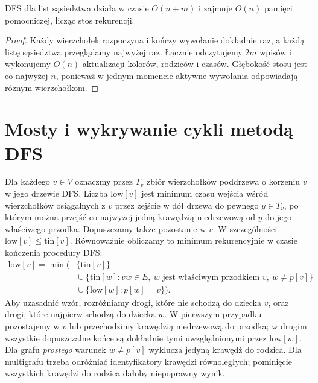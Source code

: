 \begin{stwierdzenie}
\label{prop:tg-dfs-complexity}
DFS dla list sąsiedztwa działa w czasie $O(n+m)$
i zajmuje $O(n)$ pamięci pomocniczej,
licząc stos rekurencji.
\end{stwierdzenie}
\begin{proof}
Każdy wierzchołek rozpoczyna i kończy wywołanie
dokładnie raz, a każdą listę sąsiedztwa
przeglądamy najwyżej raz. Łącznie odczytujemy
$2m$ wpisów i wykonujemy $O(n)$ aktualizacji
kolorów, rodziców i czasów. Głębokość stosu
jest co najwyżej $n$, ponieważ w jednym
momencie aktywne wywołania odpowiadają
różnym wierzchołkom.
\end{proof}

\section{Mosty i wykrywanie cykli metodą DFS}
\label{sec:tg-algo-low}

Dla każdego $v\in V$ oznaczmy przez $T_v$ zbiór
wierzchołków poddrzewa o korzeniu $v$ w jego drzewie DFS.
Liczba $\mathrm{low}[v]$ jest minimum czasu wejścia
wśród wierzchołków osiągalnych z $v$ przez zejście
w dół drzewa do pewnego $y\in T_v$, po którym można
przejść co najwyżej jedną krawędzią niedrzewową
od $y$ do jego właściwego przodka. Dopuszczamy także
pozostanie w $v$.
W szczególności $\mathrm{low}[v]\leq\mathrm{tin}[v]$.
Równoważnie obliczamy to minimum rekurencyjnie
w czasie kończenia procedury DFS:
\[
\begin{aligned}
\mathrm{low}[v]=\min\bigl(
  &\{\mathrm{tin}[v]\}\\
  &{}\cup\{\mathrm{tin}[w]:vw\in E,\
                  w\text{ jest właściwym przodkiem }v,\ w\ne p[v]\}\\
  &{}\cup\{\mathrm{low}[w]:p[w]=v\}
\bigr).
\end{aligned}
\]
Aby uzasadnić wzór, rozróżniamy drogi, które nie
schodzą do dziecka $v$, oraz drogi, które najpierw
schodzą do dziecka $w$. W pierwszym przypadku
pozostajemy w $v$ lub przechodzimy krawędzią niedrzewową
do przodka; w drugim wszystkie dopuszczalne końce
są dokładnie tymi uwzględnionymi przez $\mathrm{low}[w]$.
Dla grafu \emph{prostego} warunek $w\ne p[v]$ wyklucza
jedyną krawędź do rodzica.
Dla multigrafu trzeba odróżniać identyfikatory
krawędzi równoległych; pominięcie wszystkich
krawędzi do rodzica dałoby niepoprawny wynik.

